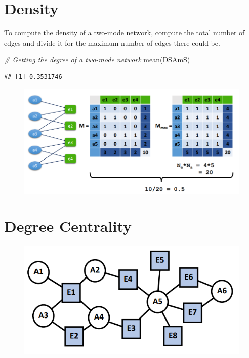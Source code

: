 \documentclass[
  notitlepage,
  onecolumn,
  openany]{book}
\newenvironment{Shaded}{\begin{snugshade}}{\end{snugshade}}
\newcommand{\CommentTok}[1]{\textcolor[rgb]{0.56,0.35,0.01}{\textit{#1}}}
\newcommand{\FunctionTok}[1]{\textcolor[rgb]{0.00,0.00,0.00}{#1}}
\newcommand{\NormalTok}[1]{#1}
\begin{document}
\hypertarget{density-1}{%
\section{Density}\label{density-1}}

To compute the density of a two-mode network, compute the total number of edges and divide it for the maximum number of edges there could be.

\begin{Shaded}
\begin{Highlighting}[]
\CommentTok{\# Getting the degree of a two{-}mode network}
\FunctionTok{mean}\NormalTok{(DSAmS)}
\end{Highlighting}
\end{Shaded}

\begin{verbatim}
## [1] 0.3531746
\end{verbatim}

\begin{figure}[h!]

{\centering \includegraphics[width=0.5\linewidth]{images/10-Two mode networks/Untitled 3} 

}

\end{figure}

\hypertarget{degree-centrality-2}{%
\section{Degree Centrality}\label{degree-centrality-2}}

\begin{figure}[h!]

{\centering \includegraphics[width=0.5\linewidth]{images/10-Two mode networks/Untitled 4} 

}

\end{figure}
\end{document}
